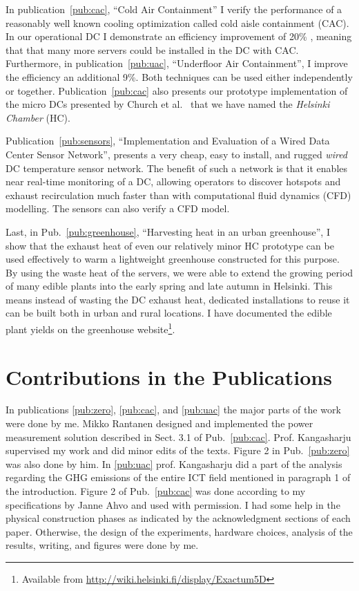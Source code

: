 \documentclass[officiallayout]{tktla}
\begin{document}
In publication~\ref{pub:cac}, ``Cold Air Containment'' I verify the
performance of a reasonably well known cooling optimization called cold aisle
containment (CAC). In our operational DC I demonstrate an efficiency
improvement of 20\% , meaning that that many more servers could be installed
in the DC with CAC. Furthermore, in publication~\ref{pub:uac}, ``Underfloor
Air Containment'', I improve the efficiency an additional 9\%. Both techniques
can be used either independently or together. Publication~\ref{pub:cac} also
presents our prototype implementation of the micro DCs presented by Church et
al.~\cite{Church2008} that we have named the \emph{Helsinki Chamber} (HC).  

Publication~\ref{pub:sensors}, ``Implementation and Evaluation of a Wired Data
Center Sensor Network'', presents a very cheap, easy to install, and rugged
\emph{wired} DC temperature sensor network. The benefit of such a network is
that it enables near real-time monitoring of a DC, allowing operators to
discover hotspots and exhaust recirculation much faster than with
computational fluid dynamics (CFD) modelling. The sensors can also verify a
CFD model.

Last, in Pub.~\ref{pub:greenhouse}, ``Harvesting heat in an urban
greenhouse'', I show that the exhaust heat of even our relatively minor HC
prototype can be used effectively to warm a lightweight greenhouse constructed
for this purpose. By using the waste heat of the servers, we were able to
extend the growing period of many edible plants into the early spring and late
autumn in Helsinki. This means instead of wasting the DC exhaust heat,
dedicated installations to reuse it can be built both in urban and rural
locations. I have documented the edible plant yields on the greenhouse
website\footnote{Available from
\url{http://wiki.helsinki.fi/display/Exactum5D}}.



\section{Contributions in the Publications}

In publications \ref{pub:zero}, \ref{pub:cac}, and \ref{pub:uac} the major
parts of the work were done by me. Mikko Rantanen designed and implemented the
power measurement solution described in Sect. 3.1 of Pub.~\ref{pub:cac}. Prof.
Kangasharju supervised my work and did minor edits of the texts. Figure 2 in
Pub.~\ref{pub:zero} was also done by him.  In \ref{pub:uac} prof. Kangasharju
did a part of the analysis regarding the GHG emissions of the entire ICT field
mentioned in paragraph 1 of the introduction. Figure 2 of Pub.~\ref{pub:cac}
was done according to my specifications by Janne Ahvo and used with
permission. I had some help in the physical construction phases as indicated
by the acknowledgment sections of each paper. Otherwise, the design of the
experiments, hardware choices, analysis of the results, writing, and figures
were done by me.
\end{document}
